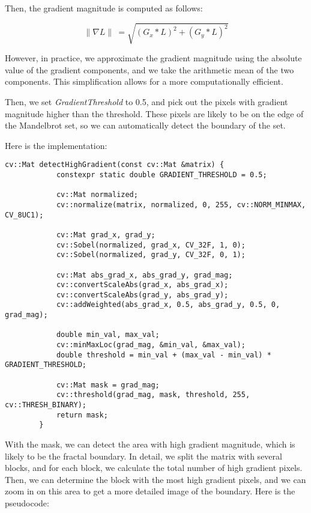 \documentclass[11pt]{article}
\begin{document}
    Then, the gradient magnitude is computed as follows:

    \begin{equation}
        \label{eq:gradient_magnitude}
        \parallel \nabla L \parallel \ = \sqrt{(G_x * L)^2 + (G_y * L)^2}
    \end{equation}

    However, in practice, we approximate the gradient magnitude using the absolute value of the gradient components, and
    we take the arithmetic mean of the two components.
    This simplification allows for a more computationally efficient.

    Then, we set \textit{GradientThreshold}
    to 0.5, and pick out the pixels with gradient magnitude higher than the threshold.
    These pixels are likely to be on the edge of the Mandelbrot set, so we can automatically detect the boundary of the
    set.

    Here is the implementation:

    \begin{lstlisting}[label={lst:detect_high_gradient}, gobble=8]
        cv::Mat detectHighGradient(const cv::Mat &matrix) {
            constexpr static double GRADIENT_THRESHOLD = 0.5;

            cv::Mat normalized;
            cv::normalize(matrix, normalized, 0, 255, cv::NORM_MINMAX, CV_8UC1);

            cv::Mat grad_x, grad_y;
            cv::Sobel(normalized, grad_x, CV_32F, 1, 0);
            cv::Sobel(normalized, grad_y, CV_32F, 0, 1);

            cv::Mat abs_grad_x, abs_grad_y, grad_mag;
            cv::convertScaleAbs(grad_x, abs_grad_x);
            cv::convertScaleAbs(grad_y, abs_grad_y);
            cv::addWeighted(abs_grad_x, 0.5, abs_grad_y, 0.5, 0, grad_mag);

            double min_val, max_val;
            cv::minMaxLoc(grad_mag, &min_val, &max_val);
            double threshold = min_val + (max_val - min_val) * GRADIENT_THRESHOLD;

            cv::Mat mask = grad_mag;
            cv::threshold(grad_mag, mask, threshold, 255, cv::THRESH_BINARY);
            return mask;
        }
    \end{lstlisting}

    With the mask, we can detect the area with high gradient magnitude, which is likely to be the fractal boundary.
    In detail, we split the matrix with several blocks, and for each block, we calculate the total number of high
    gradient pixels.
    Then, we can determine the block with the most high gradient pixels, and we can zoom in on this area to get a more
    detailed image of the boundary.
    Here is the pseudocode:
\end{document}
